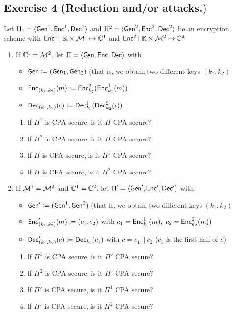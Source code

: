 \subsection{Exercise 4 (Reduction and/or attacks.)}

Let $\Pi_1=\langle \Gen^1,\Enc^1,\Dec^1\rangle$ and $\Pi^2=\langle \Gen^2,\Enc^2,\Dec^2\rangle$ be an encryption scheme with $\Enc^1 \colon \K\times \M^1 \mapsto \C^1$ and $\Enc^2 \colon \K\times \M^2 \mapsto \C^2$
\begin{enumerate}[label=\alph*.]
\item If $\C^1 = \M^2$, let $\Pi=\langle \Gen,\Enc,\Dec\rangle$ with
\begin{itemize}
  \item $\Gen\define(\Gen_1,\Gen_2)$ (that is, we obtain two different keys $(k_1,k_2)$
  \item $\Enc_{(k_1,k_2)}(m)\define\Enc_{k_2}^2(\Enc^1_{k_1}(m))$
  \item $\Dec_{(k_1,k_2)}(c)\define\Dec^1_{k_1}(\Dec^2_{k_2}(c))$
\end{itemize}

\begin{enumerate}[label=\arabic*.]
\item If $\Pi^1$ is CPA secure, is it $\Pi$ CPA secure?
\item If $\Pi^2$ is CPA secure, is it $\Pi$ CPA secure?
\item If $\Pi$ is CPA secure, is it $\Pi^1$ CPA secure?
\item If $\Pi$ is CPA secure, is it $\Pi^2$ CPA secure?
\end{enumerate}
\item If $\M^1 = \M^2$ and $\C^1 = \C^2$. let $\Pi'=\langle \Gen',\Enc',\Dec'\rangle$ with
\begin{itemize}
  \item $\Gen' \define (\Gen^1,\Gen^2)$ (that is, we obtain two different keys $(k_1,k_2)$
  \item $\Enc'_{(k_1,k_2)}(m) \define (c_1,c_2)$ with $c_1=\Enc^1_{k_1}(m),~c_2=\Enc^2_{k_2}(m))$
  \item $\Dec'_{(k_1,k_2)}(c) \define \Dec_{k_1}(c_1)$ with $c=c_1\|c_2$ ($c_1$ is the first half of $c$)
\end{itemize}

\begin{enumerate}[resume*]
\item If $\Pi^1$ is CPA secure, is it $\Pi'$ CPA secure?
\item If $\Pi^2$ is CPA secure, is it $\Pi'$ CPA secure?
\item If $\Pi'$ is CPA secure, is it $\Pi^1$ CPA secure?
\item If $\Pi'$ is CPA secure, is it $\Pi^2$ CPA secure?
\end{enumerate}
\end{enumerate}


